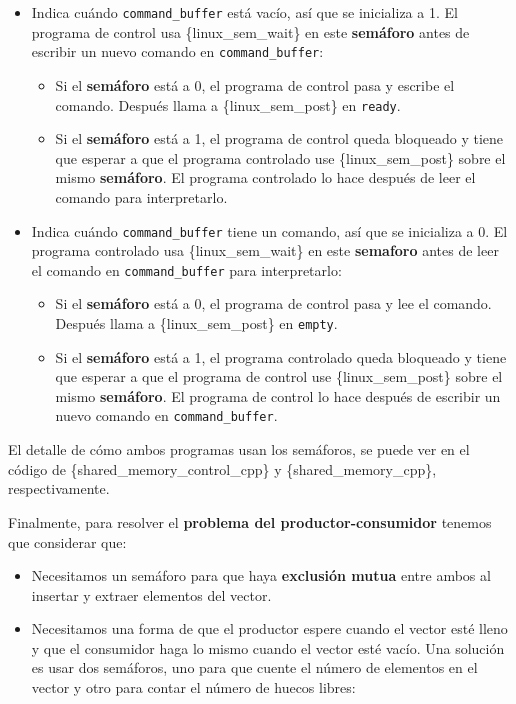 \begin{itemize}
\item
  Indica cuándo \texttt{command\_buffer} está vacío, así que se
  inicializa a 1. El programa de control usa \{linux\_sem\_wait\} en
  este \textbf{semáforo} antes de escribir un nuevo comando en
  \texttt{command\_buffer}:

  \begin{itemize}
  \item
    Si el \textbf{semáforo} está a 0, el programa de control pasa y
    escribe el comando. Después llama a \{linux\_sem\_post\} en
    \texttt{ready}.
  \item
    Si el \textbf{semáforo} está a 1, el programa de control queda
    bloqueado y tiene que esperar a que el programa controlado use
    \{linux\_sem\_post\} sobre el mismo \textbf{semáforo}. El programa
    controlado lo hace después de leer el comando para interpretarlo.
  \end{itemize}
\item
  Indica cuándo \texttt{command\_buffer} tiene un comando, así que se
  inicializa a 0. El programa controlado usa \{linux\_sem\_wait\} en
  este \textbf{semaforo} antes de leer el comando en
  \texttt{command\_buffer} para interpretarlo:

  \begin{itemize}
  \item
    Si el \textbf{semáforo} está a 0, el programa de control pasa y lee
    el comando. Después llama a \{linux\_sem\_post\} en \texttt{empty}.
  \item
    Si el \textbf{semáforo} está a 1, el programa controlado queda
    bloqueado y tiene que esperar a que el programa de control use
    \{linux\_sem\_post\} sobre el mismo \textbf{semáforo}. El programa
    de control lo hace después de escribir un nuevo comando en
    \texttt{command\_buffer}.
  \end{itemize}
\end{itemize}

El detalle de cómo ambos programas usan los semáforos, se puede ver en
el código de \{shared\_memory\_control\_cpp\} y \{shared\_memory\_cpp\},
respectivamente.

Finalmente, para resolver el \textbf{problema del productor-consumidor}
tenemos que considerar que:

\begin{itemize}
\item
  Necesitamos un semáforo para que haya \textbf{exclusión mutua} entre
  ambos al insertar y extraer elementos del vector.
\item
  Necesitamos una forma de que el productor espere cuando el vector esté
  lleno y que el consumidor haga lo mismo cuando el vector esté vacío.
  Una solución es usar dos semáforos, uno para que cuente el número de
  elementos en el vector y otro para contar el número de huecos libres:
\end{itemize}

